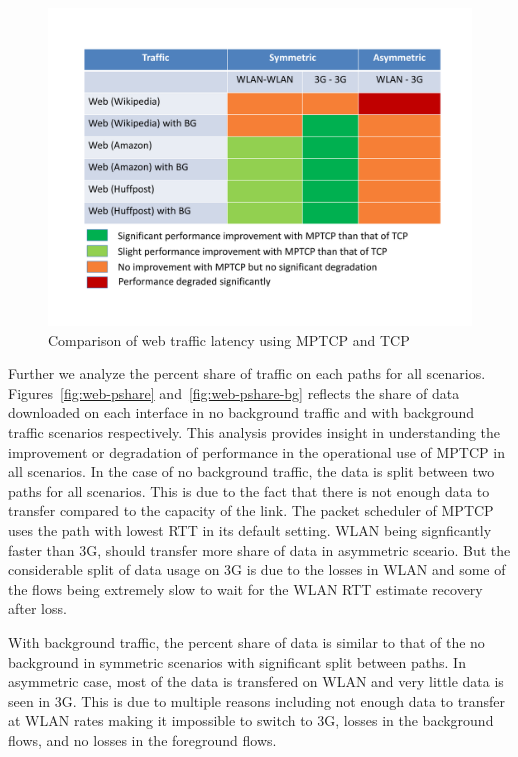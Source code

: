 \begin{figure}[!th]
\begin{minipage}[t]{0.48\textwidth}
\begin{center}
\includegraphics[width=.98\linewidth]{plots/MPTCP-Web}
\end{center}
\caption{Comparison of web traffic latency using MPTCP and TCP}
  \label{fig:web-summary}
\end{minipage}
\end{figure}

Further we analyze the percent share of traffic on each paths for all scenarios. Figures~\ref{fig:web-pshare} and~\ref{fig:web-pshare-bg} reflects the 
share of data downloaded on each interface in no background traffic and with background traffic scenarios respectively. This analysis provides insight
in understanding the improvement or degradation of performance in the operational use of MPTCP in all scenarios. In the case of no background traffic,
the data is split between two paths for all scenarios. This is due to the fact that there is not enough data to transfer compared to the capacity of the
link. The packet scheduler of MPTCP uses the path with lowest RTT in its default setting. WLAN being signficantly faster than 3G, should transfer more share 
of data in asymmetric sceario. But the considerable split of data usage on 3G is due to the losses in WLAN and some of the flows being extremely
slow to wait for the WLAN RTT estimate recovery after loss.

With background traffic, the percent share of data is similar to that of the no background in symmetric scenarios with significant split between paths.
In asymmetric case, most of the data is transfered on WLAN and very little data is seen in 3G. This is due to multiple reasons including not enough data 
to transfer at WLAN rates making it impossible to switch to 3G, losses in the background flows, and no losses in the foreground flows.

